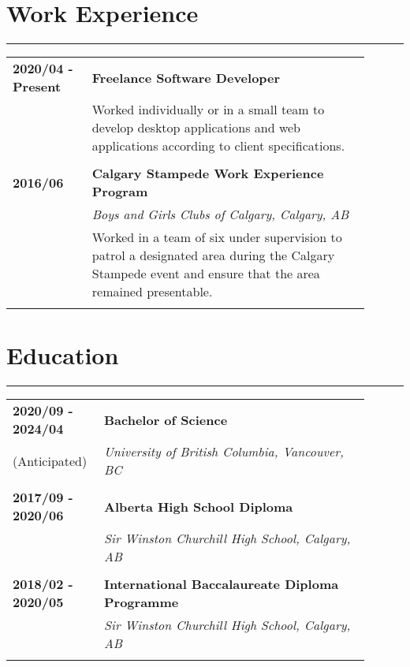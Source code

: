 \documentclass[letterpaper]{article}
\newcommand{\horizontalLine}{%
    \rule{\linewidth}{0.2pt}
    \vspace{1ex}
}
\begin{document}
    \section*{Work Experience}

        \horizontalLine

        \begin{tabular}{p{0.2\linewidth} p{0.7\linewidth}} 
            \textbf{2020/04 - Present} & \large\textbf{Freelance Software Developer} \\
            & Worked individually or in a small team to develop desktop applications and web applications according to client specifications. \\
            \\
            \textbf{2016/06} & \large\textbf{Calgary Stampede Work Experience Program} \\
            & \emph{Boys and Girls Clubs of Calgary, Calgary, AB} \\
            & Worked in a team of six under supervision to patrol a designated area during the Calgary Stampede event and ensure that the area remained presentable. \\
            \\
        \end{tabular}

    \section*{Education}

        \horizontalLine

        \begin{tabular}{p{0.2\linewidth} p{0.7\linewidth}} 
            \textbf{2020/09 - 2024/04} & \large\textbf{Bachelor of Science} \\
            (Anticipated) & \emph{University of British Columbia, Vancouver, BC} \\
            \\
            \textbf{2017/09 - 2020/06} & \large\textbf{Alberta High School Diploma} \\
            & \emph{Sir Winston Churchill High School, Calgary, AB} \\
            \\
            \textbf{2018/02 - 2020/05} & \large\textbf{International Baccalaureate Diploma Programme} \\
            & \emph{Sir Winston Churchill High School, Calgary, AB} \\
            \\
        \end{tabular}
\end{document}
